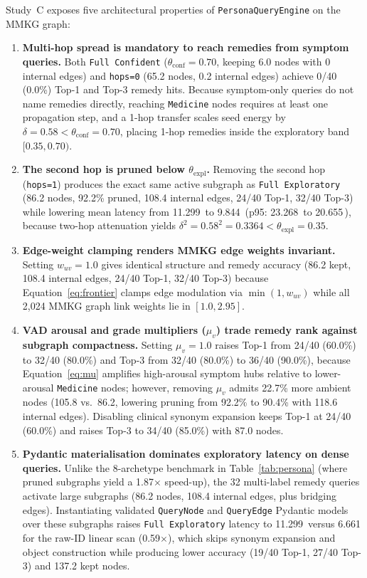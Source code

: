 \documentclass[12pt,a4paper,oneside]{report}
\newcommand{\code}[1]{\texttt{\small #1}}
\newcommand{\ms}{\,\text{ms}}
\begin{document}
\noindent Study~C exposes five architectural properties of \code{PersonaQueryEngine} on the MMKG graph:
\begin{enumerate}
  \item \textbf{Multi-hop spread is mandatory to reach remedies from symptom queries.} Both \code{Full Confident} ($\theta_{\text{conf}}=0.70$, keeping 6.0 nodes with 0 internal edges) and \code{hops=0} (65.2 nodes, 0.2 internal edges) achieve 0/40 (0.0\%) Top-1 and Top-3 remedy hits. Because symptom-only queries do not name remedies directly, reaching \code{Medicine} nodes requires at least one propagation step, and a 1-hop transfer scales seed energy by $\delta=0.58 < \theta_{\text{conf}}=0.70$, placing 1-hop remedies inside the exploratory band $[0.35, 0.70)$.
  \item \textbf{The second hop is pruned below $\theta_{\text{expl}}$.} Removing the second hop (\code{hops=1}) produces the exact same active subgraph as \code{Full Exploratory} (86.2 nodes, 92.2\% pruned, 108.4 internal edges, 24/40 Top-1, 32/40 Top-3) while lowering mean latency from 11.299\ms{} to 9.844\ms{} (p95: 23.268\ms{} to 20.655\ms{}), because two-hop attenuation yields $\delta^2 = 0.58^2 = 0.3364 < \theta_{\text{expl}} = 0.35$.
  \item \textbf{Edge-weight clamping renders MMKG edge weights invariant.} Setting $w_{uv}=1.0$ gives identical structure and remedy accuracy (86.2 kept, 108.4 internal edges, 24/40 Top-1, 32/40 Top-3) because Equation~\eqref{eq:frontier} clamps edge modulation via $\min(1, w_{uv})$ while all 2{,}024 MMKG graph link weights lie in $[1.0, 2.95]$.
  \item \textbf{VAD arousal and grade multipliers ($\mu_v$) trade remedy rank against subgraph compactness.} Setting $\mu_v=1.0$ raises Top-1 from 24/40 (60.0\%) to 32/40 (80.0\%) and Top-3 from 32/40 (80.0\%) to 36/40 (90.0\%), because Equation~\eqref{eq:mu} amplifies high-arousal symptom hubs relative to lower-arousal \code{Medicine} nodes; however, removing $\mu_v$ admits 22.7\% more ambient nodes (105.8 vs.\ 86.2, lowering pruning from 92.2\% to 90.4\% with 118.6 internal edges). Disabling clinical synonym expansion keeps Top-1 at 24/40 (60.0\%) and raises Top-3 to 34/40 (85.0\%) with 87.0 nodes.
  \item \textbf{Pydantic materialisation dominates exploratory latency on dense queries.} Unlike the 8-archetype benchmark in Table~\ref{tab:persona} (where pruned subgraphs yield a 1.87$\times$ speed-up), the 32 multi-label remedy queries activate large subgraphs (86.2 nodes, 108.4 internal edges, plus bridging edges). Instantiating validated \code{QueryNode} and \code{QueryEdge} Pydantic models over these subgraphs raises \code{Full Exploratory} latency to 11.299\ms{} versus 6.661\ms{} for the raw-ID linear scan (0.59$\times$), which skips synonym expansion and object construction while producing lower accuracy (19/40 Top-1, 27/40 Top-3) and 137.2 kept nodes.
\end{enumerate}
\end{document}
